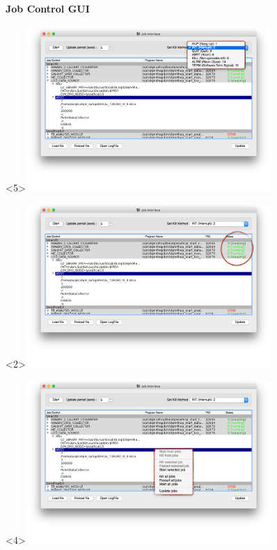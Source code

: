 \documentclass[8pt]{beamer}
\begin{document}
  \begin{frame}
    \frametitle{\secname}
    \framesubtitle{ Job Control GUI }

      \begin{overlayarea}{\textwidth}{\textheight}
      	\begin{center}
        		\begin{onlyenv}<5>\includegraphics[width=0.7\textwidth]{figs/JobInterface/JobInterface_KillSwitch.png}\end{onlyenv}
       		\begin{onlyenv}\includegraphics[width=0.7\textwidth]{figs/JobInterface/JobInterface_LiveStatus.png}\end{onlyenv}
        		\begin{onlyenv}<4>\includegraphics[width=0.7\textwidth]{figs/JobInterface/JobInterface_Module.png}\end{onlyenv}

\end{center}
\end{overlayarea}
\end{frame}
\end{document}

